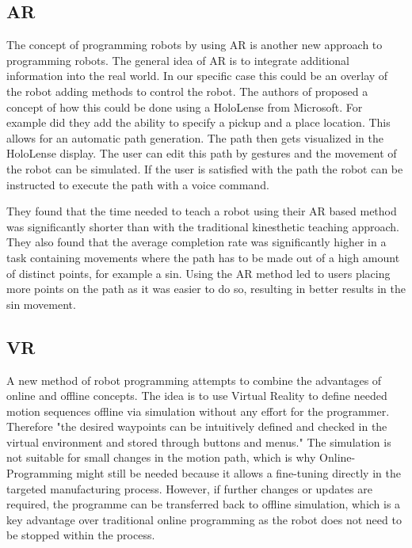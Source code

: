 \documentclass[conference]{IEEEtran}
\begin{document}
    \subsection{AR}
    
        The concept of programming robots by using AR is another new approach to programming robots.
        The general idea of AR is to integrate additional information into the real world. In our specific case this could be an overlay of the robot adding methods to control the robot.
        The authors of \cite{p3} proposed a concept of how this could be done using a HoloLense from Microsoft.
        For example did they add the ability to specify a pickup and a place location. This allows for an automatic path generation. The path then gets visualized in the HoloLense display. The user can edit this path by gestures and the movement of the robot can be simulated.
        If the user is satisfied with the path the robot can be instructed to execute the path with a voice command. %
        \cite[p. 2]{p3}

        They found that the time needed to teach a robot using their AR based method was significantly shorter than with the traditional kinesthetic teaching approach. 
        They also found that the average completion rate was significantly higher in a task containing movements where the path has to be made out of a high amount of distinct points, for example a sin. Using the AR method led to users placing more points on the path as it was easier to do so, resulting in better results in the sin movement.
        \cite[pp. 4-5]{p3}

    \subsection{VR}
        A new method of robot programming attempts to combine the advantages of online and offline concepts. The idea is to use Virtual Reality to define needed motion sequences offline via simulation without any effort for the programmer. Therefore "the desired waypoints can be intuitively defined and checked in the virtual environment and stored through buttons and menus."  \cite[625]{p2} The simulation is not suitable for small changes in the motion path, which is why Online-Programming might still be needed because it allows a fine-tuning directly in the targeted manufacturing process.  However, if further changes or updates are required, the programme can be transferred back to offline simulation, which is a key advantage over traditional online programming as the robot does not need to be stopped within the process. \cite[625]{p2}
\end{document}
